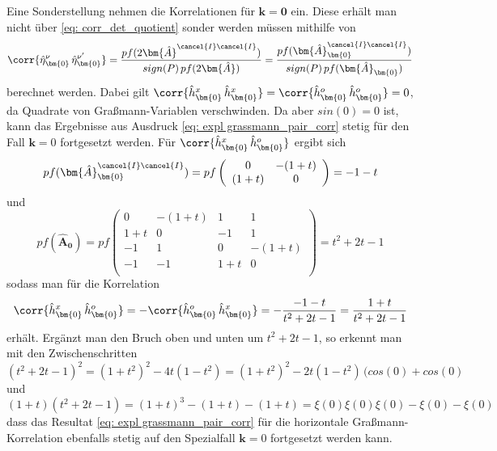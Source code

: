 \noindent Eine Sonderstellung nehmen die Korrelationen für $\bm{k} = \bm{0}$ ein. Diese erhält man nicht über \eqref{eq: corr_det_quotient} sonder werden müssen mithilfe von 
\begin{equation}
\corr{\hat{\eta}_{\bm{0}}^{\nu}\, \hat{\eta}_{\bm{0}}^{\nu'}} = 
\frac{pf(2\bm{\hat{A}}^{\cancel{I} \cancel{I}})}{sign(P)\,pf(2\bm{\hat{A}})} = \frac{pf(\bm{\hat{A}}_{\bm{0}}^{\cancel{I} \cancel{I}})}{sign(P)\,pf(\bm{\hat{A}}_{\bm{0}})}
\end{equation}
berechnet werden. Dabei gilt $ \corr{\hat{h}_{\bm{0}}^x\, \hat{h}_{\bm{0}}^x} = \corr{\hat{h}_{\bm{0}}^o\, \hat{h}_{\bm{0}}^o} = 0$, da Quadrate von Graßmann-Variablen verschwinden. Da aber $sin(0) = 0$ ist, kann das Ergebnisse aus Ausdruck \eqref{eq: expl grassmann_pair_corr} stetig für den Fall $\bm{k} = 0$ fortgesetzt werden. Für $\corr{\hat{h}_{\bm{0}}^x\, \hat{h}_{\bm{0}}^o} $ ergibt sich 
\begin{equation}
pf(\bm{\hat{A}}_{\bm{0}}^{\cancel{I} \cancel{I}}) = pf\left(\begin{array}{cc} 0 & -(1+t) \\ (1+t) & 0\end{array}\right) = -1-t
\end{equation}
und 
\begin{equation}
pf(\bm{\hat{A}}_{\bm{0}})= pf\left(\begin{array}{cccc} 
        0         &-(1+t)  &  1       & 1        \\
        1+t&0         &  -1       &  1        \\
        -1        &1        &  0       & -(1+t)  \\
        -1         &-1        &1+t&  0        \\
    \end{array}\right) = t^2 + 2t - 1
\end{equation}
sodass man für die Korrelation
\begin{equation}
\corr{\hat{h}_{\bm{0}}^x\, \hat{h}_{\bm{0}}^o}  = -\corr{\hat{h}_{\bm{0}}^o\, \hat{h}_{\bm{0}}^x} = - \frac{-1-t}{t^2 + 2t - 1} = \frac{1+t}{t^2 + 2t - 1}
\end{equation}
erhält. Ergänzt man den Bruch oben und unten um $t^2 + 2t - 1$, so erkennt man mit den Zwischenschritten
$$ (t^2 + 2t - 1)^2 = (1+t^2)^2 - 4t(1-t^2) =(1+t^2)^2 - 2t(1-t^2)\,(cos(0) + cos(0)$$
und 
$$ (1+t)(t^2 + 2t - 1) = (1+t)^3 - (1+t) - (1+t) = \xi(0)\xi(0)\xi(0) -\xi(0) - \xi(0) $$
dass das Resultat \eqref{eq: expl grassmann_pair_corr} für die horizontale Graßmann-Korrelation ebenfalls stetig auf den Spezialfall $\bm{k} = 0$ fortgesetzt werden kann. 
